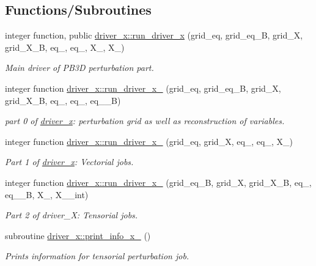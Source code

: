 \subsection*{Functions/\+Subroutines}
\begin{DoxyCompactItemize}
\item 
integer function, public \hyperlink{namespacedriver__x_ada3d72a0929daaa5e3da585246d62281}{driver\+\_\+x\+::run\+\_\+driver\+\_\+x} (grid\+\_\+eq, grid\+\_\+eq\+\_\+B, grid\+\_\+X, grid\+\_\+\+X\+\_\+B, eq\+\_, eq\+\_, X\+\_, X\+\_)
\begin{DoxyCompactList}\small\item\em Main driver of P\+B3D perturbation part. \end{DoxyCompactList}\item 
integer function \hyperlink{namespacedriver__x_a2b82a9bc6c0f4af9f3468d03fedc008e}{driver\+\_\+x\+::run\+\_\+driver\+\_\+x\+\_} (grid\+\_\+eq, grid\+\_\+eq\+\_\+B, grid\+\_\+X, grid\+\_\+\+X\+\_\+B, eq\+\_, eq\+\_, eq\+\_\+\_\+B)
\begin{DoxyCompactList}\small\item\em part 0 of \hyperlink{namespacedriver__x}{driver\+\_\+x}\+: perturbation grid as well as reconstruction of variables. \end{DoxyCompactList}\item 
integer function \hyperlink{namespacedriver__x_a454779cefa6da3714d32eedcec0ef7de}{driver\+\_\+x\+::run\+\_\+driver\+\_\+x\+\_} (grid\+\_\+eq, grid\+\_\+X, eq\+\_, eq\+\_, X\+\_)
\begin{DoxyCompactList}\small\item\em Part 1 of \hyperlink{namespacedriver__x}{driver\+\_\+x}\+: Vectorial jobs. \end{DoxyCompactList}\item 
integer function \hyperlink{namespacedriver__x_ad3924b3d66f336f0a9a9559eafffec8e}{driver\+\_\+x\+::run\+\_\+driver\+\_\+x\+\_} (grid\+\_\+eq\+\_\+B, grid\+\_\+X, grid\+\_\+\+X\+\_\+B, eq\+\_, eq\+\_\+\_\+B, X\+\_, X\+\_\+\_\+int)
\begin{DoxyCompactList}\small\item\em Part 2 of driver\+\_\+X\+: Tensorial jobs. \end{DoxyCompactList}\item 
subroutine \hyperlink{namespacedriver__x_aca49d362e21df044e21d5ba4b2599cf4}{driver\+\_\+x\+::print\+\_\+info\+\_\+x\+\_} ()
\begin{DoxyCompactList}\small\item\em Prints information for tensorial perturbation job. \end{DoxyCompactList}\end{DoxyCompactItemize}
